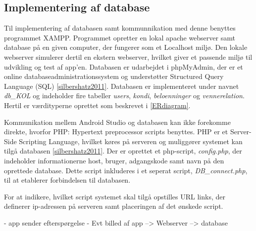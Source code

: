 \subsection{Implementering af database}
Til implementering af databasen samt kommunnikation med denne benyttes programmet XAMPP. Programmet opretter en lokal apache webserver samt database på en given computer, der fungerer som et Localhost miljø. Den lokale webserver simulerer dertil en ekstern webserver, hvilket giver et passende miljø til udvikling og test af app'en. Databasen er udarbejdet i phpMyAdmin, der er et online databaseadministrationssystem og understøtter Structured Query Language (SQL) \autoref{silbershatz2011}. 
Databasen er implementeret under navnet \textit{db_KOL} og indeholder fire tabeller \textit{users}, \textit{kondi}, \textit{beloenninger} og \textit{vennerelation}. Hertil er værdityperne oprettet som beskrevet i \autoref{ERdiagram}.


Kommunikation mellem Android Studio og databasen kan ikke forekomme direkte, hvorfor PHP: Hypertext preprocessor scripts benyttes. PHP er et Server-Side Scripting Language, hvilket køres på serveren og muliggører systemet kan tilgå databasen \autoref{silbershatz2011}. 
Der er oprettet et php-script, \textit{config.php}, der indeholder informationerne host, bruger, adgangskode samt navn på den oprettede database. Dette script inkluderes i et seperat script, \textit{DB_connect.php}, til at etablerer forbindelsen til databasen. 

For at indikere, hvilket script systemet skal tilgå opstilles URL links, der definerer ip-adressen på serveren samt placeringen af det ønskede script.

- app sender efterspørgelse
- Evt billed af app --> Webserver --> database
